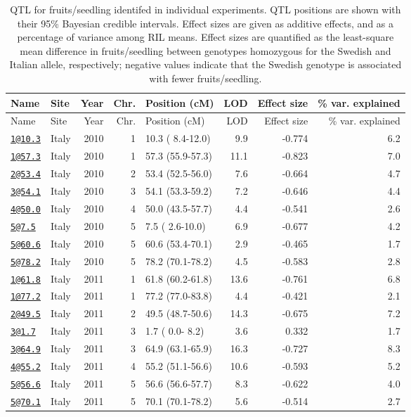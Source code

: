 \documentclass[]{article}
\begin{document}
\begin{longtable}[]{@{}llrrlrrr@{}}
\caption{\label{tab:individual-ffit-qtl}QTL for fruits/seedling identifed in individual experiments. QTL positions are shown with their 95\% Bayesian credible intervals. Effect sizes are given as additive effects, and as a percentage of variance among RIL means. Effect sizes are quantified as the least-square mean difference in fruits/seedling between genotypes homozygous for the Swedish and Italian allele, respectively; negative values indicate that the Swedish genotype is associated with fewer fruits/seedling.}\tabularnewline
\toprule
Name & Site & Year & Chr. & Position (cM) & LOD & Effect size & \% var. explained\tabularnewline
\midrule
\endfirsthead
\toprule
Name & Site & Year & Chr. & Position (cM) & LOD & Effect size & \% var. explained\tabularnewline
\midrule
\endhead
\href{mailto:1@10.3}{\nolinkurl{1@10.3}} & Italy & 2010 & 1 & 10.3 ( 8.4-12.0) & 9.9 & -0.774 & 6.2\tabularnewline
\href{mailto:1@57.3}{\nolinkurl{1@57.3}} & Italy & 2010 & 1 & 57.3 (55.9-57.3) & 11.1 & -0.823 & 7.0\tabularnewline
\href{mailto:2@53.4}{\nolinkurl{2@53.4}} & Italy & 2010 & 2 & 53.4 (52.5-56.0) & 7.6 & -0.664 & 4.7\tabularnewline
\href{mailto:3@54.1}{\nolinkurl{3@54.1}} & Italy & 2010 & 3 & 54.1 (53.3-59.2) & 7.2 & -0.646 & 4.4\tabularnewline
\href{mailto:4@50.0}{\nolinkurl{4@50.0}} & Italy & 2010 & 4 & 50.0 (43.5-57.7) & 4.4 & -0.541 & 2.6\tabularnewline
\href{mailto:5@7.5}{\nolinkurl{5@7.5}} & Italy & 2010 & 5 & 7.5 ( 2.6-10.0) & 6.9 & -0.677 & 4.2\tabularnewline
\href{mailto:5@60.6}{\nolinkurl{5@60.6}} & Italy & 2010 & 5 & 60.6 (53.4-70.1) & 2.9 & -0.465 & 1.7\tabularnewline
\href{mailto:5@78.2}{\nolinkurl{5@78.2}} & Italy & 2010 & 5 & 78.2 (70.1-78.2) & 4.5 & -0.583 & 2.8\tabularnewline
\href{mailto:1@61.8}{\nolinkurl{1@61.8}} & Italy & 2011 & 1 & 61.8 (60.2-61.8) & 13.6 & -0.761 & 6.8\tabularnewline
\href{mailto:1@77.2}{\nolinkurl{1@77.2}} & Italy & 2011 & 1 & 77.2 (77.0-83.8) & 4.4 & -0.421 & 2.1\tabularnewline
\href{mailto:2@49.5}{\nolinkurl{2@49.5}} & Italy & 2011 & 2 & 49.5 (48.7-50.6) & 14.3 & -0.675 & 7.2\tabularnewline
\href{mailto:3@1.7}{\nolinkurl{3@1.7}} & Italy & 2011 & 3 & 1.7 ( 0.0- 8.2) & 3.6 & 0.332 & 1.7\tabularnewline
\href{mailto:3@64.9}{\nolinkurl{3@64.9}} & Italy & 2011 & 3 & 64.9 (63.1-65.9) & 16.3 & -0.727 & 8.3\tabularnewline
\href{mailto:4@55.2}{\nolinkurl{4@55.2}} & Italy & 2011 & 4 & 55.2 (51.1-56.6) & 10.6 & -0.593 & 5.2\tabularnewline
\href{mailto:5@56.6}{\nolinkurl{5@56.6}} & Italy & 2011 & 5 & 56.6 (56.6-57.7) & 8.3 & -0.622 & 4.0\tabularnewline
\href{mailto:5@70.1}{\nolinkurl{5@70.1}} & Italy & 2011 & 5 & 70.1 (70.1-78.2) & 5.6 & -0.514 & 2.7\tabularnewline

\end{longtable}
\end{document}
